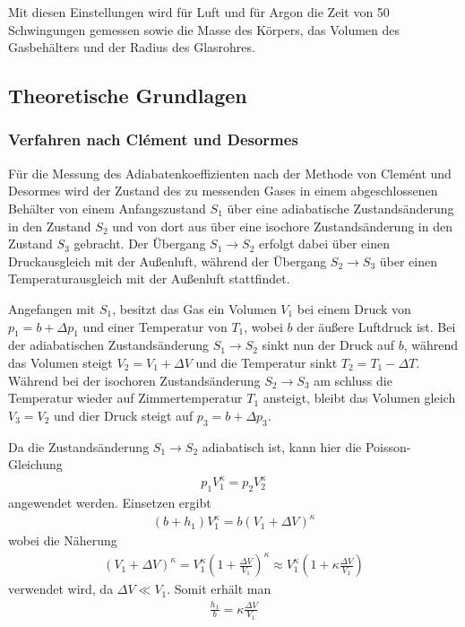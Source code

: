 \documentclass[12pt,a4paper,german]{scrartcl}
\numberwithin{equation}{section}
\begin{document}
  Mit diesen Einstellungen wird für Luft und für Argon die Zeit von 50 Schwingungen gemessen sowie die Masse des Körpers, das Volumen des Gasbehälters und der Radius des Glasrohres.
  
  \subsection{Theoretische Grundlagen}
  \subsubsection{Verfahren nach Clément und Desormes}
  Für die Messung des Adiabatenkoeffizienten nach der Methode von Clemént und  Desormes wird der Zustand des zu messenden Gases in einem abgeschlossenen Behälter von einem Anfangszustand $S_1$ über eine adiabatische Zustandsänderung in den Zustand $S_2$ und von dort aus über eine isochore Zustandsänderung in den Zustand $S_3$ gebracht.
  Der Übergang $S_1 \rightarrow S_2$ erfolgt dabei über einen Druckausgleich mit der Außenluft, während der Übergang $S_2 \rightarrow S_3$ über einen Temperaturausgleich mit der Außenluft stattfindet.

  Angefangen mit $S_1$, besitzt das Gas ein Volumen $V_1$ bei einem Druck von $p_1 = b + \Delta p_1$ und einer Temperatur von $T_1$, wobei $b$ der äußere Luftdruck ist.
  Bei der adiabatischen Zustandsänderung $S_1 \rightarrow S_2$ sinkt nun der Druck auf $b$, während das Volumen steigt $V_2 = V_1 + \Delta V$ und die Temperatur sinkt $T_2 = T_1 - \Delta T$.
  Während bei der isochoren Zustandsänderung $S_2 \rightarrow S_3$ am schluss die Temperatur wieder auf Zimmertemperatur $T_1$ ansteigt, bleibt das Volumen gleich $V_3 = V_2$ und dier Druck steigt auf $p_3 = b + \Delta p_3$.

  Da die Zustandsänderung $S_1 \rightarrow S_2$ adiabatisch ist, kann hier die Poisson-Gleichung
  \begin{align}
    p_1 V_1^\kappa = p_2 V_2^\kappa
    \label{eq_theo_poisson}
  \end{align}
  angewendet werden.
  Einsetzen ergibt
  \begin{align}
    (b + h_1) V_1^\kappa = b (V_1 + \Delta V)^\kappa
  \end{align}
  wobei die Näherung
  \begin{align}
    (V_1 + \Delta V)^\kappa = V_1^\kappa \left(1 + \frac{\Delta V}{V_1}\right)^\kappa \approx V_1^\kappa \left(1 + \kappa \frac{\Delta V}{V_1} \right)
  \end{align}
  verwendet wird, da $\Delta V \ll V_1$. Somit erhält man
  \begin{align}
    \frac{h_1}{b} = \kappa \frac{\Delta V}{V_1}
    \label{eq_theo_poisson_converted}
  \end{align}
\end{document}

